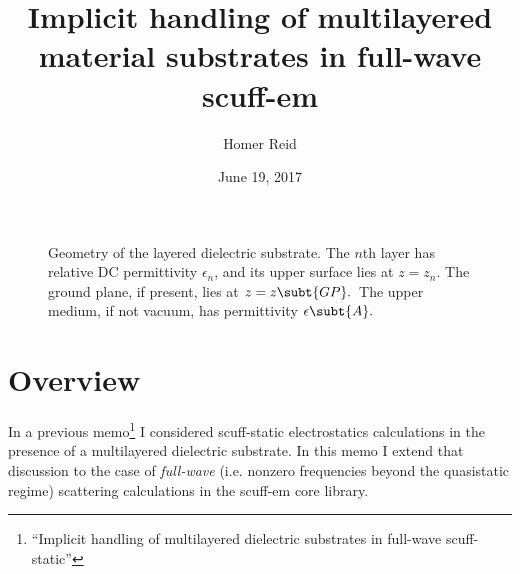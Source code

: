 \documentclass[letterpaper]{article}
\title {Implicit handling of multilayered material substrates
        in full-wave {\sc scuff-em}
       }
\author {Homer Reid}
\date {June 19, 2017}
\begin{document}
\pagestyle{myheadings}

\maketitle

\tableofcontents

\newpage
\begin{figure}
\begin{center}
\caption{Geometry of the layered dielectric substrate. The $n$th layer
has relative DC permittivity $\epsilon_n$, and its upper surface
lies at $z=z_n$. The ground plane, if present, lies
at $z=z\subt{GP}.$ The upper medium, if not vacuum, has permittivity
$\epsilon\subt{A}.$}
\label{SubstrateGeometryFigure}
\end{center}
\end{figure}
\section{Overview}

In a 
previous memo\footnote{``Implicit handling of multilayered dielectric
substrates in full-wave {\sc scuff-static}''} I
considered {\sc scuff-static} electrostatics calculations
in the presence of a multilayered dielectric substrate.
In this memo I extend that discussion to the case of
\textit{full-wave} (i.e. nonzero frequencies beyond the
quasistatic regime) scattering calculations in the
{\sc scuff-em} core library.
\end{document}

